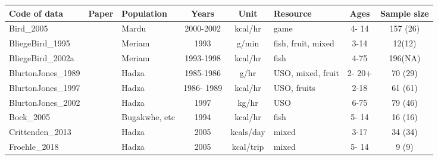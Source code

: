 \begin{landscape}
\begin{longtable}{M{2.6cm} M{3.6cm} M{1.5cm} c c M{1cm} c c}
\hline
{} 
Code of data                  & Paper                                     & Population      & Years      & Unit      & Resource           & Ages    & Sample size \\ \hline
\endfirsthead
%
\endhead
%
Bird\_2005                     & \cite{bird_mardu_2005}                    & Mardu           & 2000-2002  & kcal/hr   & game               & 4- 14   & 157 (26)    \\
BliegeBird\_1995               & \cite{bird_children_1995}                 & Meriam          & 1993       & g/min     & fish, fruit, mixed & 3-14    & 12(12)      \\
BliegeBird\_2002a              & \cite{bird_constraints_2002}              & Meriam          & 1993-1998  & kcal/hr   & fish               & 4-75    & 196(NA)     \\
BlurtonJones\_1989             & \cite{blurton_jones_modelling_1989}       & Hadza           & 1985-1986  & g/hr      & USO, mixed, fruit  & 2- 20+  & 70 (29)     \\
BlurtonJones\_1997             & \cite{blurton_jones_why_1997}             & Hadza           & 1986- 1989 & kcal/hr   & USO, fruits        & 2-18    & 61 (61)     \\
BlurtonJones\_2002             & \cite{blurton_jones_selection_2002}       & Hadza           & 1997       & kg/hr     & USO                & 6-75    & 79 (46)     \\
Bock\_2005                     & \cite{bock_what_2005}                     & Bugakwhe, etc & 1994       & kcal/hr   & fish               & 5- 14   & 16 (16)     \\
Crittenden\_2013               & \cite{crittenden_juvenile_2013}           & Hadza           & 2005       & kcals/day & mixed              & 3-17    & 34 (34)     \\
Froehle\_2018                  & \cite{froehle_physical_2019}              & Hadza           & 2005       & kcal/trip & mixed              & 5- 14   & 9 (9)       \\

\end{longtable}
\end{landscape}
